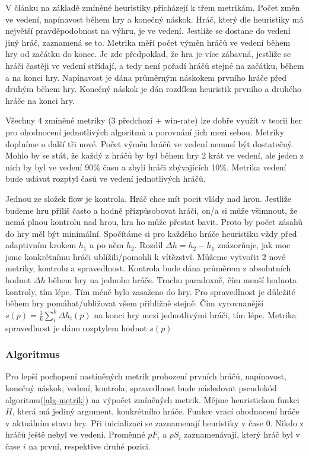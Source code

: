 V článku \cite{24DynLev} na základě zmíněné heuristiky přicházejí k třem metrikám. Počet změn ve vedení, napínavost během hry a konečný náskok. Hráč, který dle heuristiky má největší pravděpodobnost na výhru, je ve vedení. Jestliže se dostane do vedení jiný hráč, zaznamená se to. Metrika měří počet výměn hráčů ve vedení během hry od začátku do konce. Je zde předpoklad, že hra je více zábavná, jestliže se hráči častěji ve vedení střídají, a tedy není pořadí hráčů stejné na začátku, během a na konci hry. Napínavost je dána průměrným náskokem prvního hráče před druhým během hry. Konečný náskok je dán rozdílem heuristik prvního a druhého hráče na konci hry.

Všechny 4 zmíněné metriky (3 předchozí + win-rate) lze dobře využít v teorii her pro ohodnocení jednotlivých algoritmů a porovnání jich mezi sebou. Metriky doplníme o další tři nové. Počet výměn hráčů ve vedení nemusí být dostatečný. Mohlo by se stát, že každý z hráčů by byl během hry 2 krát ve vedení, ale jeden z nich by byl ve vedení 90\% času a zbylí hráči zbývajících 10\%. Metrika vedení bude udávat rozptyl časů ve vedení jednotlivých hráčů.

Jednou ze složek flow je kontrola. Hráč chce mít pocit vlády nad hrou. Jestliže budeme hru příliš často a hodně přizpůsobovat hráči, on/a si může všimnout, že nemá plnou kontrolu nad hrou, hra ho může přestat bavit. Proto by počet zásahů do hry měl být minimální. Spočítáme si pro každého hráče heuristiku vždy před adaptivním krokem $h_1$ a po něm $h_2$. Rozdíl $\Delta h = h_2 - h_1$ znázorňuje, jak moc jsme konkrétnímu hráči ublížili/pomohli k vítězství.  Můžeme vytvořit 2 nové metriky, kontrolu a spravedlnost. Kontrola bude dána průměrem z absolutních hodnot $\Delta h$ během hry na jednoho hráče. Trochu paradoxně, čím menší hodnota kontroly, tím lépe. Tím méně bylo zasaženo do hry. Pro spravedlnost je důležité během hry pomáhat/ubližovat všem přibližně stejně. Čím vyrovnanější $s(p) = \frac{1}{k}\sum_i^k \Delta h_i(p)$ na konci hry mezi jednotlivými hráči, tím lépe. Metrika spravedlnost je dáno rozptylem hodnot $s(p)$

\subsubsection{Algoritmus}

Pro lepší pochopení nastíněných metrik prohození prvních hráčů, napínavost, konečný náskok, vedení, kontrola, spravedlnost bude následovat pseudokód algoritmu(\ref{alg-metrik}) na výpočet zmíněných metrik. Mějme heuristickou funkci $H$, která má jediný argument, konkrétního hráče. Funkce vrací ohodnocení hráče v aktuálním stavu hry. Při inicializaci se zaznamenají heuristiky v čase 0. Nikdo z hráčů ještě nebyl ve vedení. Proměnné $pF_i$ a $pS_i$ zaznamenávají, který hráč byl v čase $i$ na první, respektive druhé pozici.

